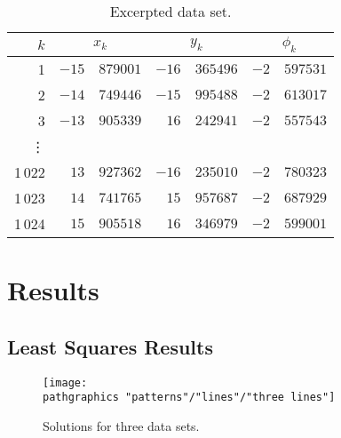   \begin{table}[htbp]  %
    \caption{Excerpted data set.}
    \begin{center}
      \begin{tabular}{r r@{.}l  r@{.}l  r@{.}l}
        $k$ & \multicolumn{2}{c}{$x_{k}$} & \multicolumn{2}{c}{$y_{k}$} & \multicolumn{2}{c}{$\phi_{k}$}\\\hline
         1  & $ -15 $ & $ 879001 $ & $ -16 $ & $ 365496 $ & $ -2 $ & $ 597531 $ \\
         2  & $ -14 $ & $ 749446 $ & $ -15 $ & $ 995488 $ & $ -2 $ & $ 613017 $ \\
         3  & $ -13 $ & $ 905339 $ & $ 16 $  & $ 242941 $ & $ -2 $ & $ 557543 $ \\
         \vdots \\
        1\,022	 & $	13	$ & $	927362	$ & $	-16	$ & $	235010	 $ & $	-2	$ & $	780323	 $ 	\\
        1\,023	 & $	14	$ & $	741765	$ & $	15	$ & $	957687	 $ & $	-2	$ & $	687929	 $ 	\\
        1\,024	 & $	15	$ & $	905518	$ & $	16	$ & $	346979	 $ & $	-2	$ & $	599001	 $ 	\\
      \end{tabular}
    \end{center}
  \end{table}%

\section{Results} %

\subsection{Least Squares Results}  %

\begin{figure}[htbp] %
   \centering
   \texttt{[image: \\pathgraphics "patterns"/"lines"/"three lines"]} 
   \caption{Solutions for three data sets.}
   \label{fig:three lines}
\end{figure}

